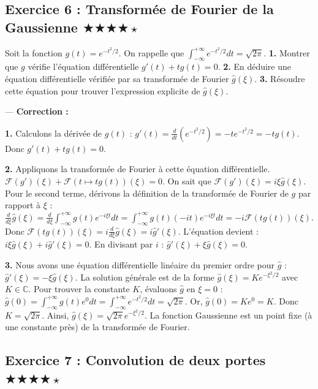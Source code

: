 \documentclass[11pt,a4paper]{article}
\begin{document}
\subsection*{Exercice 6 : Transformée de Fourier de la Gaussienne \quad $\bigstar\bigstar\bigstar\bigstar\star$}

Soit la fonction $g(t) = e^{-t^2/2}$.
On rappelle que $\int_{-\infty}^{+\infty} e^{-t^2/2} dt = \sqrt{2\pi}$.
\textbf{1.} Montrer que $g$ vérifie l'équation différentielle $g'(t) + t g(t) = 0$.
\textbf{2.} En déduire une équation différentielle vérifiée par sa transformée de Fourier $\hat{g}(\xi)$.
\textbf{3.} Résoudre cette équation pour trouver l'expression explicite de $\hat{g}(\xi)$.

---
\textbf{Correction :}

\textbf{1.} Calculons la dérivée de $g(t)$ :
$g'(t) = \frac{d}{dt}(e^{-t^2/2}) = -t e^{-t^2/2} = -t g(t)$.
Donc $g'(t) + t g(t) = 0$.

\textbf{2.} Appliquons la transformée de Fourier à cette équation différentielle.
$\mathcal{F}(g')(\xi) + \mathcal{F}(t \mapsto t g(t))(\xi) = 0$.
On sait que $\mathcal{F}(g')(\xi) = i\xi \hat{g}(\xi)$.
Pour le second terme, dérivons la définition de la transformée de Fourier de $g$ par rapport à $\xi$ :
$\frac{d}{d\xi} \hat{g}(\xi) = \frac{d}{d\xi} \int_{-\infty}^{+\infty} g(t) e^{-i\xi t} dt = \int_{-\infty}^{+\infty} g(t) (-it) e^{-i\xi t} dt = -i \mathcal{F}(t g(t))(\xi)$.
Donc $\mathcal{F}(t g(t))(\xi) = i \frac{d}{d\xi} \hat{g}(\xi) = i \hat{g}'(\xi)$.
L'équation devient :
$i\xi \hat{g}(\xi) + i \hat{g}'(\xi) = 0$.
En divisant par $i$ :
$\hat{g}'(\xi) + \xi \hat{g}(\xi) = 0$.

\textbf{3.} Nous avons une équation différentielle linéaire du premier ordre pour $\hat{g}$ : $\hat{g}'(\xi) = -\xi \hat{g}(\xi)$.
La solution générale est de la forme $\hat{g}(\xi) = K e^{-\xi^2/2}$ avec $K \in \mathbb{C}$.
Pour trouver la constante $K$, évaluons $\hat{g}$ en $\xi = 0$ :
$\hat{g}(0) = \int_{-\infty}^{+\infty} g(t) e^0 dt = \int_{-\infty}^{+\infty} e^{-t^2/2} dt = \sqrt{2\pi}$.
Or, $\hat{g}(0) = K e^0 = K$.
Donc $K = \sqrt{2\pi}$.
Ainsi, $\hat{g}(\xi) = \sqrt{2\pi} e^{-\xi^2/2}$.
La fonction Gaussienne est un point fixe (à une constante près) de la transformée de Fourier.


\subsection*{Exercice 7 : Convolution de deux portes \quad $\bigstar\bigstar\bigstar\bigstar\star$}
\end{document}
